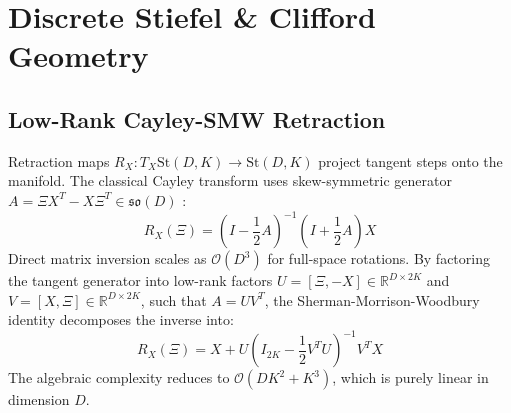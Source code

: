 \documentclass[journal,10pt,compsoc]{IEEEtran}
\theoremstyle{plain}
\theoremstyle{definition}
\begin{document}
\section{Discrete Stiefel \& Clifford Geometry}
\label{sec:geometry}

\subsection{Low-Rank Cayley-SMW Retraction}
Retraction maps $R_X: T_X \mathrm{St}(D, K) \to \mathrm{St}(D, K)$ project tangent steps onto the manifold. The classical Cayley transform uses skew-symmetric generator $A = \Xi X^T - X \Xi^T \in \mathfrak{so}(D)$ \cite{cayley1846proprietes}:
\begin{equation}
\label{eq:cayley_classic}
R_X(\Xi) = \left( I - \frac{1}{2} A \right)^{-1} \left( I + \frac{1}{2} A \right) X
\end{equation}
Direct matrix inversion scales as $\mathcal{O}(D^3)$ for full-space rotations. By factoring the tangent generator into low-rank factors $U = [\Xi, -X] \in \mathbb{R}^{D \times 2K}$ and $V = [X, \Xi] \in \mathbb{R}^{D \times 2K}$, such that $A = U V^T$, the Sherman-Morrison-Woodbury identity \cite{sherman1950adjustment, woodbury1950inverting} decomposes the inverse into:
\begin{equation}
\label{eq:cayley_smw_formula}
R_X(\Xi) = X + U \left( I_{2K} - \frac{1}{2} V^T U \right)^{-1} V^T X
\end{equation}
The algebraic complexity reduces to $\mathcal{O}(D K^2 + K^3)$, which is purely linear in dimension $D$.
\end{document}
